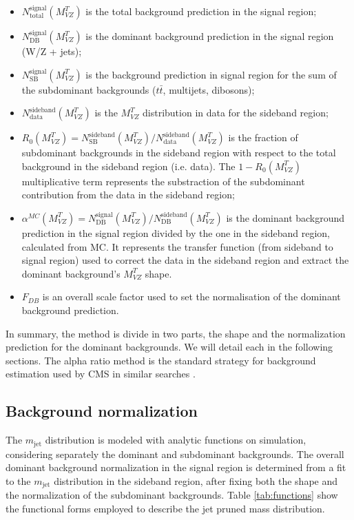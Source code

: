 \begin{itemize}
\item
$N_{\text{total}}^{\text{signal}}(M_{VZ}^{T})$ is the total background prediction in the signal region;
\item
$N_{\text{DB}}^{\text{signal}}(M_{VZ}^{T})$ is the dominant background prediction in the signal region (W/Z + jets);
\item
$N_{\text{SB}}^{\text{signal}}(M_{VZ}^{T})$ is the background prediction in signal region for the sum of the subdominant backgrounds ($t\bar{t}$, multijets, dibosons);
\item
$N_{\text{data}}^{\text{sideband}}(M_{VZ}^{T})$ is the $M_{VZ}^{T}$ distribution in data for the sideband region;
\item
$R_{0}(M_{VZ}^{T})= N_{\text{SB}}^{\text{sideband}}(M_{VZ}^{T})/N_{\text{data}}^{\text{sideband}}(M_{VZ}^{T})$ is the fraction of subdominant backgrounds in the sideband region with respect to the total background in the sideband region (i.e. data). The $1-R_{0}(M_{VZ}^{T})$ multiplicative term represents the substraction of the subdominant contribution from the data in the sideband region;
\item
$\alpha^{MC}(M_{VZ}^{T})= N_{\text{DB}}^{\text{signal}}(M_{VZ}^{T})/N_{\text{DB}}^{\text{sideband}}(M_{VZ}^{T}) $ is the dominant background prediction in the signal region divided by the one in the sideband region, calculated from MC. It represents the transfer function (from sideband to signal region) used to correct the data in the sideband region and extract the dominant background’s $M_{VZ}^{T}$ shape.
\item
$F_{DB}$ is an overall scale factor used to set the normalisation of the dominant background prediction.
\end{itemize}

In summary, the method is divide in two parts, the shape and the normalization prediction for the dominant backgrounds. We will detail each in the following sections. The alpha ratio method is the standard strategy for background estimation used by CMS in similar searches \cite{CMS:2013xea,CMS-PAS-EXO-12-022, CMS-PAS-EXO-15-002}. 


\subsection{Background normalization}

The $m_{\text{jet}}$ distribution is modeled with analytic functions on simulation, considering separately the dominant and subdominant backgrounds. The overall dominant background normalization in the signal region is determined from a fit to the $m_{\text{jet}}$  distribution in the sideband region, after fixing both the shape and the normalization of the subdominant backgrounds. Table \ref{tab:functions} show the functional forms employed to describe the jet pruned mass distribution.

